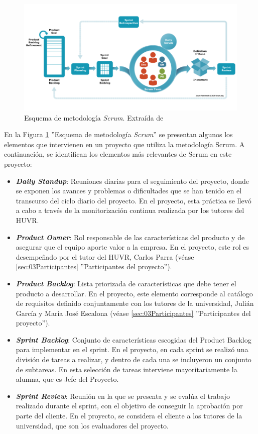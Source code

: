 \begin{figure}[H]
    \centering
    \includegraphics[width=1\textwidth]{figures/scrumFramework.png}
     \caption{Esquema de metodología \textit{Scrum}. Extraída de \parencite{scrumWebsite}}
    \label{fig:scrumFramework}
\end{figure}

En la Figura \ref{fig:scrumFramework} ''Esquema de metodología \textit{Scrum}'' se presentan algunos los elementos que intervienen en un proyecto que utiliza la metodología Scrum. A continuación, se identifican los elementos más relevantes de Scrum en este proyecto:

\begin{itemize}
    \item \textbf{\textit{Daily Standup}}: Reuniones diarias para el seguimiento del proyecto, donde se exponen los avances y problemas o dificultades que se han tenido en el transcurso del ciclo diario del proyecto. En el proyecto, esta práctica se llevó a cabo a través de la monitorización continua realizada por los tutores del HUVR.
    \item \textbf{\textit{Product Owner}}: Rol responsable de las características del producto y de asegurar que el equipo aporte valor a la empresa. En el proyecto, este rol es desempeñado por el tutor del HUVR, Carlos Parra (véase \ref{sec:03Participantes} ''Participantes del proyecto'').
    \item \textbf{\textit{Product Backlog}}: Lista priorizada de características que debe tener el producto a desarrollar. En el proyecto, este elemento corresponde al catálogo de requisitos definido conjuntamente con los tutores de la universidad, Julián García y Maria José Escalona (véase \ref{sec:03Participantes} ''Participantes del proyecto'').
    \item \textbf{\textit{Sprint Backlog}}: Conjunto de características escogidas del Product Backlog para implementar en el sprint. En el proyecto, en cada sprint se realizó una división de tareas a realizar, y dentro de cada una se incluyeron un conjunto de subtareas. En esta selección de tareas interviene mayoritariamente la alumna, que es Jefe del Proyecto.
    \item \textbf{\textit{Sprint Review}}: Reunión en la que se presenta y se evalúa el trabajo realizado durante el sprint, con el objetivo de conseguir la aprobación por parte del cliente. En el proyecto, se considera el cliente a los tutores de la universidad, que son los evaluadores del proyecto.
\end{itemize}

